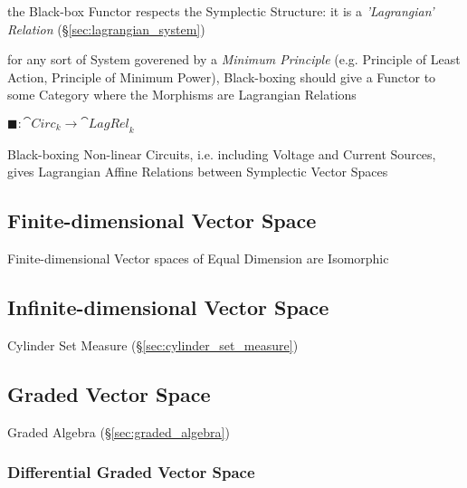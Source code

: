 the Black-box Functor respects the Symplectic Structure: it is a
\emph{'Lagrangian' Relation} (\S\ref{sec:lagrangian_system})

for any sort of System goverened by a \emph{Minimum Principle} (e.g. Principle
of Least Action, Principle of Minimum Power), Black-boxing should give a
Functor to some Category where the Morphisms are Lagrangian Relations

$\blacksquare : \cat{Circ}_k \rightarrow \cat{LagRel}_k$

Black-boxing Non-linear Circuits, i.e. including Voltage and Current Sources,
gives Lagrangian Affine Relations between Symplectic Vector Spaces



\subsection{Finite-dimensional Vector Space}
\label{sec:finite_dimensional_vectorspace}

Finite-dimensional Vector spaces of Equal Dimension are Isomorphic



\subsection{Infinite-dimensional Vector Space}
\label{sec:infinite_dimensional_vectorspace}

Cylinder Set Measure (\S\ref{sec:cylinder_set_measure})



\subsection{Graded Vector Space}\label{sec:graded_vectorspace}

Graded Algebra (\S\ref{sec:graded_algebra})



\subsubsection{Differential Graded Vector Space}\label{sec:differential_graded}

